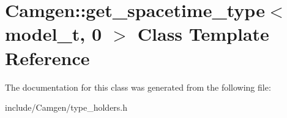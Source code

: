 \hypertarget{a00254}{}\section{Camgen\+:\+:get\+\_\+spacetime\+\_\+type$<$ model\+\_\+t, 0 $>$ Class Template Reference}
\label{a00254}


The documentation for this class was generated from the following file\+:\begin{DoxyCompactItemize}
\item 
include/\+Camgen/type\+\_\+holders.\+h\end{DoxyCompactItemize}
